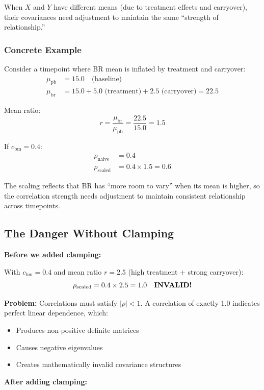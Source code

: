 \documentclass[11pt]{article}
\begin{document}
When $X$ and $Y$ have different means (due to treatment effects and carryover), their covariances need adjustment to maintain the same ``strength of relationship.''

\subsubsection{Concrete Example}

Consider a timepoint where BR mean is inflated by treatment and carryover:
\begin{align*}
\mu_{\text{pb}} &= 15.0 \quad \text{(baseline)} \\
\mu_{\text{br}} &= 15.0 + 5.0 \text{ (treatment)} + 2.5 \text{ (carryover)} = 22.5
\end{align*}

Mean ratio:
\[
r = \frac{\mu_{\text{br}}}{\mu_{\text{pb}}} = \frac{22.5}{15.0} = 1.5
\]

If $c_{\text{bm}} = 0.4$:
\begin{align*}
\rho_{\text{naive}} &= 0.4 \\
\rho_{\text{scaled}} &= 0.4 \times 1.5 = 0.6
\end{align*}

The scaling reflects that BR has ``more room to vary'' when its mean is higher, so the correlation strength needs adjustment to maintain consistent relationship across timepoints.

\subsection{The Danger Without Clamping}

\textbf{Before we added clamping:}

With $c_{\text{bm}} = 0.4$ and mean ratio $r = 2.5$ (high treatment + strong carryover):
\[
\rho_{\text{scaled}} = 0.4 \times 2.5 = 1.0 \quad \text{\textbf{INVALID!}}
\]

\textbf{Problem:} Correlations must satisfy $|\rho| < 1$. A correlation of exactly 1.0 indicates perfect linear dependence, which:
\begin{itemize}
    \item Produces non-positive definite matrices
    \item Causes negative eigenvalues
    \item Creates mathematically invalid covariance structures
\end{itemize}

\textbf{After adding clamping:}
\end{document}
